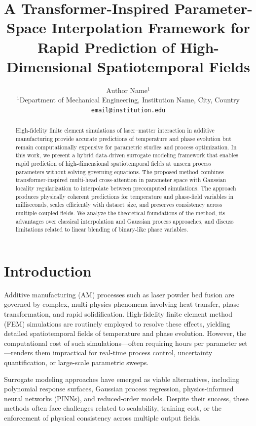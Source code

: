 \documentclass[10pt]{article}
\title{\textbf{A Transformer-Inspired Parameter-Space Interpolation Framework for Rapid Prediction of High-Dimensional Spatiotemporal Fields}}
\author{
Author Name$^{1}$ \\
\small $^{1}$Department of Mechanical Engineering, Institution Name, City, Country \\
\small \texttt{email@institution.edu}
}
\date{}
\begin{document}
\maketitle

\begin{abstract}
High-fidelity finite element simulations of laser--matter interaction in additive manufacturing provide accurate predictions of temperature and phase evolution but remain computationally expensive for parametric studies and process optimization. In this work, we present a hybrid data-driven surrogate modeling framework that enables rapid prediction of high-dimensional spatiotemporal fields at unseen process parameters without solving governing equations. The proposed method combines transformer-inspired multi-head cross-attention in parameter space with Gaussian locality regularization to interpolate between precomputed simulations. The approach produces physically coherent predictions for temperature and phase-field variables in milliseconds, scales efficiently with dataset size, and preserves consistency across multiple coupled fields. We analyze the theoretical foundations of the method, its advantages over classical interpolation and Gaussian process approaches, and discuss limitations related to linear blending of binary-like phase variables.
\end{abstract}

\section{Introduction}

Additive manufacturing (AM) processes such as laser powder bed fusion are governed by complex, multi-physics phenomena involving heat transfer, phase transformation, and rapid solidification. High-fidelity finite element method (FEM) simulations are routinely employed to resolve these effects, yielding detailed spatiotemporal fields of temperature and phase evolution. However, the computational cost of such simulations---often requiring hours per parameter set---renders them impractical for real-time process control, uncertainty quantification, or large-scale parametric sweeps.

Surrogate modeling approaches have emerged as viable alternatives, including polynomial response surfaces, Gaussian process regression, physics-informed neural networks (PINNs), and reduced-order models. Despite their success, these methods often face challenges related to scalability, training cost, or the enforcement of physical consistency across multiple output fields.
\end{document}
